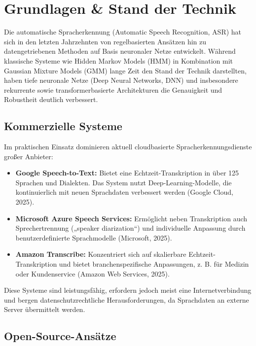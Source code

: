 \chapter{Grundlagen \& Stand der Technik}

Die automatische Spracherkennung (Automatic Speech Recognition, ASR) hat sich in den letzten Jahrzehnten von regelbasierten Ansätzen hin zu datengetriebenen Methoden auf Basis neuronaler Netze entwickelt. Während klassische Systeme wie Hidden Markov Models (HMM) in Kombination mit Gaussian Mixture Models (GMM) lange Zeit den Stand der Technik darstellten, haben tiefe neuronale Netze (Deep Neural Networks, DNN) und insbesondere rekurrente sowie transformerbasierte Architekturen die Genauigkeit und Robustheit deutlich verbessert.

\section{Kommerzielle Systeme}

Im praktischen Einsatz dominieren aktuell cloudbasierte Spracherkennungsdienste großer Anbieter:

\begin{itemize}
\item \textbf{Google Speech-to-Text:} Bietet eine Echtzeit-Transkription in über 125 Sprachen und Dialekten. Das System nutzt Deep-Learning-Modelle, die kontinuierlich mit neuen Sprachdaten verbessert werden (Google Cloud, 2025).

\item \textbf{Microsoft Azure Speech Services:} Ermöglicht neben Transkription auch Sprechertrennung („speaker diarization“) und individuelle Anpassung durch benutzerdefinierte Sprachmodelle (Microsoft, 2025).

\item \textbf{Amazon Transcribe:} Konzentriert sich auf skalierbare Echtzeit-Transkription und bietet branchenspezifische Anpassungen, z. B. für Medizin oder Kundenservice (Amazon Web Services, 2025).
\end{itemize}
Diese Systeme sind leistungsfähig, erfordern jedoch meist eine Internetverbindung und bergen datenschutzrechtliche Herausforderungen, da Sprachdaten an externe Server übermittelt werden.

\section{Open-Source-Ansätze}

